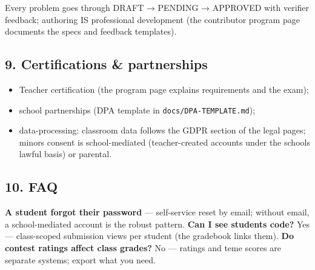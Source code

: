 \documentclass[
]{article}
\providecommand{\tightlist}{%
  \setlength{\itemsep}{0pt}\setlength{\parskip}{0pt}}
\begin{document}
Every problem goes through DRAFT → PENDING → APPROVED with verifier
feedback; authoring IS professional development (the contributor program
page documents the specs and feedback templates).

\subsection{9. Certifications \&
partnerships}\label{9-certifications--partnerships}

\begin{itemize}
\tightlist
\item
  Teacher certification (the program page explains requirements and the
  exam);
\item
  school partnerships (DPA template in \texttt{docs/DPA-TEMPLATE.md});
\item
  data-processing: classroom data follows the GDPR section of the legal
  pages; minors\textquotesingle{} consent is school-mediated
  (teacher-created accounts under the school\textquotesingle s lawful
  basis) or parental.
\end{itemize}

\subsection{10. FAQ}\label{10-faq}

\textbf{A student forgot their password} --- self-service reset by
email; without email, a school-mediated account is the robust pattern.
\textbf{Can I see students\textquotesingle{} code?} Yes --- class-scoped
submission views per student (the gradebook links them). \textbf{Do
contest ratings affect class grades?} No --- ratings and teme scores are
separate systems; export what you need.
\end{document}
